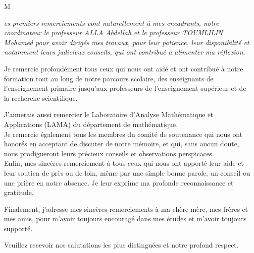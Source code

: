 \documentclass[12pt,a4paper]{report}%
\begin{document}
\begin{center}
{\Huge M}{ {\it es premiers remerciements vont naturellement à mes encadrants, notre coordinateur le professeur ALLA Abdellah et le professeur TOUMLILIN Mohamed pour avoir dirigés mes travaux, pour leur patience, leur disponibilité et notamment leurs judicieux conseils, qui ont contribué à alimenter ma réflexion.\\
\vspace*{0.6cm}

Je remercie profondément tous ceux qui nous ont aidé et ont contribué à notre formation tout au long de notre parcours scolaire, des enseignants de l'enseignement primaire jusqu'aux professeurs de l'enseignement supérieur et de la recherche scientifique.\\
\vspace*{0.6cm}

J’aimerais aussi remercier le Laboratoire d'Analyse  Mathématique et Applications (LAMA) du département de mathématique.\\
\vspace*{0.6cm}
Je remercie également tous les membres du comité de soutenance qui nous ont honorés en acceptant de discuter de notre mémoire, et qui, sans aucun doute, nous prodigueront leurs précieux conseils et observations perspicaces.
\\
\vspace*{0.6cm}
Enfin, mes sincères remerciement à tous ceux qui nous ont apporté leur aide et leur soutien de près ou de loin, même par une simple bonne parole, un conseil ou une prière en notre absence. Je leur exprime ma profonde reconnaissance et gratitude.\\
\vspace*{0.6cm}

Finalement, j'adresse mes sincères remerciements à ma chère mère, mes frères et mes amis, pour m’avoir toujours encouragé dans mes études et m’avoir toujours supporté.\\
\vspace*{0.6cm}

Veuillez recevoir nos salutations les plus distinguées et notre profond respect.
 }}
 \end{center}



\tableofcontents
\newpage

\end{document}
